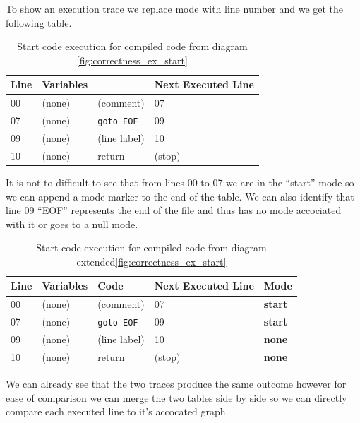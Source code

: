 To show an execution trace we replace mode with line number and we get the following table.

\begin{table}[htcb]
	\caption{Start code execution for compiled code from diagram \ref{fig:correctness_ex_start}}
	\centering
		\begin{tabular}{| l | l | l | l |}
			\hline
			\textbf{Line} & \textbf{Variables} & \text{Code} & \textbf{Next Executed Line} \\
			\hline
			00 & (none) & (comment) & 07 \\
			\hline
			07 & (none) & \texttt{goto EOF} & 09 \\
			\hline
			09 & (none) & (line label) & 10 \\
			\hline
			10 & (none) & return & (stop) \\
			\hline
		\end{tabular}
	\label{table:BasicExecOnly}
\end{table}

It is not to difficult to see that from lines 00 to 07 we are in the ``start'' mode so we can append a
mode marker to the end of the table. We can also identify that line 09 ``EOF'' represents the end of the
file and thus has no mode accociated with it or goes to a null mode.

\begin{table}[htcb]
	\caption{Start code execution for compiled code from diagram extended\ref{fig:correctness_ex_start}}
	\centering
		\begin{tabular}{| l | l | l | l | l |}
			\hline
			\textbf{Line} & \textbf{Variables} & \textbf{Code} & \textbf{Next Executed Line} & \textbf{Mode}\\
			\hline
			00 & (none) & (comment) & 07 & \textbf{start} \\
			\hline
			07 & (none) & \texttt{goto EOF} & 09 &  \textbf{start}\\
			\hline
			09 & (none) & (line label) & 10 & \textbf{none} \\
			\hline
			10 & (none) & return & (stop) & \textbf{none} \\
			\hline
		\end{tabular}
	\label{table:BasicExecMode}
\end{table}

We can already see that the two traces produce the same outcome however for ease of comparison we can
merge the two tables side by side so we can directly compare each executed line to it's accocated graph.

